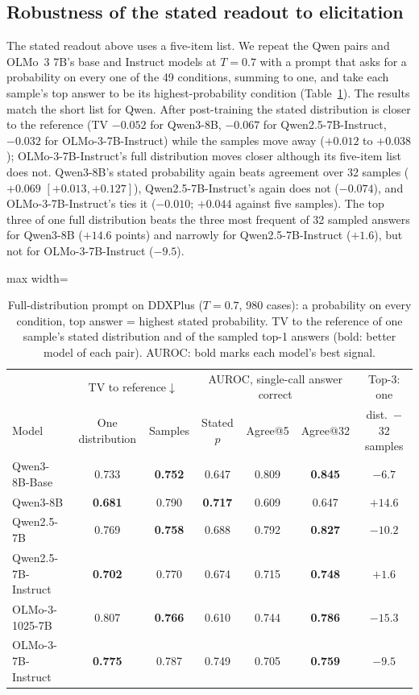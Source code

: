 \documentclass[wcp]{jmlr}
\begin{document}
\subsection{Robustness of the stated readout to elicitation}\label{sec:fullprompt}
The stated readout above uses a five-item list. We repeat the Qwen pairs and OLMo~3 7B's base and Instruct models at $T{=}0.7$ with a prompt that asks for a probability on every one of the 49 conditions, summing to one, and take each sample's top answer to be its highest-probability condition (Table~\ref{tab:fullprompt}).
The results match the short list for Qwen. After post-training the stated distribution is closer to the reference (TV $-0.052$ for Qwen3-8B, $-0.067$ for Qwen2.5-7B-Instruct, $-0.032$ for OLMo-3-7B-Instruct) while the samples move away ($+0.012$ to $+0.038$); OLMo-3-7B-Instruct's full distribution moves closer although its five-item list does not.
Qwen3-8B's stated probability again beats agreement over 32 samples ($+0.069$ $[+0.013,+0.127]$), Qwen2.5-7B-Instruct's again does not ($-0.074$), and OLMo-3-7B-Instruct's ties it ($-0.010$; $+0.044$ against five samples). The top three of one full distribution beats the three most frequent of 32 sampled answers for Qwen3-8B ($+14.6$ points) and narrowly for Qwen2.5-7B-Instruct ($+1.6$), but not for OLMo-3-7B-Instruct ($-9.5$).

\begin{table}[t]
\centering\small
\setlength{\tabcolsep}{4pt}
\begin{adjustbox}{max width=\linewidth}
\begin{tabular}{lcccccc}
\toprule
 & \multicolumn{2}{c}{TV to reference$\downarrow$} & \multicolumn{3}{c}{AUROC, single-call answer correct} & Top-3: one \\
Model & One distribution & Samples & Stated $p$ & Agree@5 & Agree@32 & dist.\ $-$ 32 samples \\
\midrule
Qwen3-8B-Base & 0.733 & \textbf{0.752} & 0.647 & 0.809 & \textbf{0.845} & $-6.7$ \\
Qwen3-8B & \textbf{0.681} & 0.790 & \textbf{0.717} & 0.609 & 0.647 & $+14.6$ \\
Qwen2.5-7B & 0.769 & \textbf{0.758} & 0.688 & 0.792 & \textbf{0.827} & $-10.2$ \\
Qwen2.5-7B-Instruct & \textbf{0.702} & 0.770 & 0.674 & 0.715 & \textbf{0.748} & $+1.6$ \\
OLMo-3-1025-7B & 0.807 & \textbf{0.766} & 0.610 & 0.744 & \textbf{0.786} & $-15.3$ \\
OLMo-3-7B-Instruct & \textbf{0.775} & 0.787 & 0.749 & 0.705 & \textbf{0.759} & $-9.5$ \\
\bottomrule
\end{tabular}
\end{adjustbox}
\caption{Full-distribution prompt on DDXPlus ($T{=}0.7$, 980 cases): a probability on every condition, top answer = highest stated probability. TV to the reference of one sample's stated distribution and of the sampled top-1 answers (bold: better model of each pair). AUROC: bold marks each model's best signal.}
\label{tab:fullprompt}
\end{table}
\end{document}
